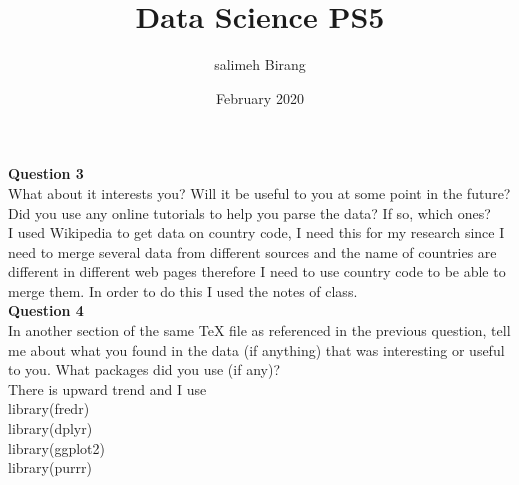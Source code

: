 \documentclass{article}
\title{Data Science PS5}
\author{salimeh Birang }
\date{February 2020}
\begin{document}
\maketitle

\section*{}
\noindent
\textbf{Question 3}\\
What about it interests you? Will it be useful to you at some point in the future? Did you use any online tutorials to help you parse the data? If so, which ones?\\
I used Wikipedia to get data on country code, I need this for my research since I need to merge several data from different sources and the name of countries are different in different web pages therefore I need to use country code to be able to merge them. In order to do this I used the notes of class.\\

\noindent
\textbf{Question 4}\\
In another section of the same TeX file as referenced in the previous question, tell me about what you found in the data (if anything) that was interesting or useful to you. What packages did you use (if any)?\\
 There is upward trend and I use \\
library(fredr)\\
library(dplyr)\\
library(ggplot2)\\
library(purrr)\\
\end{document}
